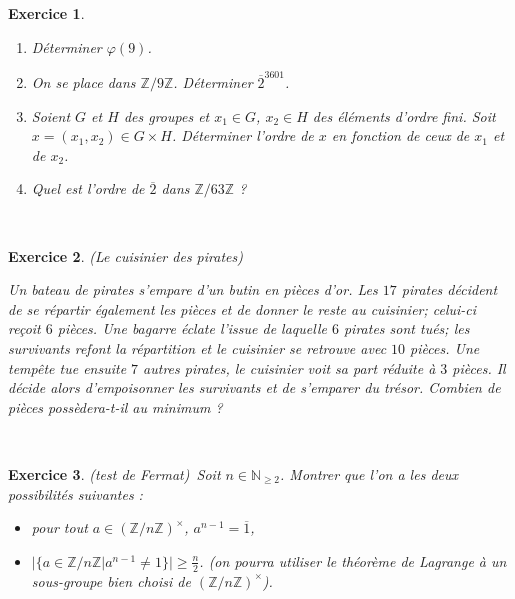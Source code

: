 \documentclass[11pt,a4paper]{article}
\newtheorem{ex}{Exercice}
\newcommand{\N}{\mathbb{N}}
\newcommand{\Z}{\mathbb{Z}}
\begin{document}
\

\


\begin{ex}\label{Calcul_puissance}
\begin{enumerate}

\item Déterminer $\varphi(9)$.


\item On se place dans $\Z/9\Z$. Déterminer $\overline{2}^{3601}$.

\item Soient $G$ et $H$ des groupes et $x_1\in G$, $x_2\in H$ des éléments d'ordre fini.  Soit $x=(x_1,x_2)\in G\times H$. Déterminer l'ordre de 
$x$ en fonction de ceux de $x_1$ et de $x_2$.

\item Quel est l'ordre de $\overline{2}$ dans $\Z/63\Z$ ?
\end{enumerate}
\end{ex}



\



\begin{ex}\label{cuisinier_pirates}(Le cuisinier des pirates)\

Un bateau de pirates s'empare d'un butin en pièces d'or. Les $17$ pirates décident de se répartir également les pièces et de donner le reste au cuisinier; celui-ci reçoit $6$ pièces. Une bagarre éclate  l'issue de laquelle $6$ pirates sont tués; les survivants refont la répartition et le cuisinier se retrouve avec $10$ pièces. Une tempête tue ensuite $7$ autres pirates, le cuisinier voit sa part réduite à $3$ pièces. Il décide alors d'empoisonner les survivants et de s'emparer du trésor. Combien de pièces possèdera-t-il au minimum ?


\end{ex}


\




\begin{ex}\label{test_Fermat}(test de Fermat)\
Soit $n \in \N_{\geq 2}$. Montrer que l'on a les deux possibilités suivantes : \begin{itemize}
\item pour tout $a\in (\Z/n\Z)^\times$,  $a^{n-1}=\overline{1}$,

\item $|\{a\in \Z/n\Z|a^{n-1}\neq 1\}|\geq \frac{n}{2}$. (on pourra utiliser le théorème de Lagrange à un sous-groupe bien choisi de $(\Z/n\Z)^\times$).
\end{itemize}

\end{ex}
\end{document}
